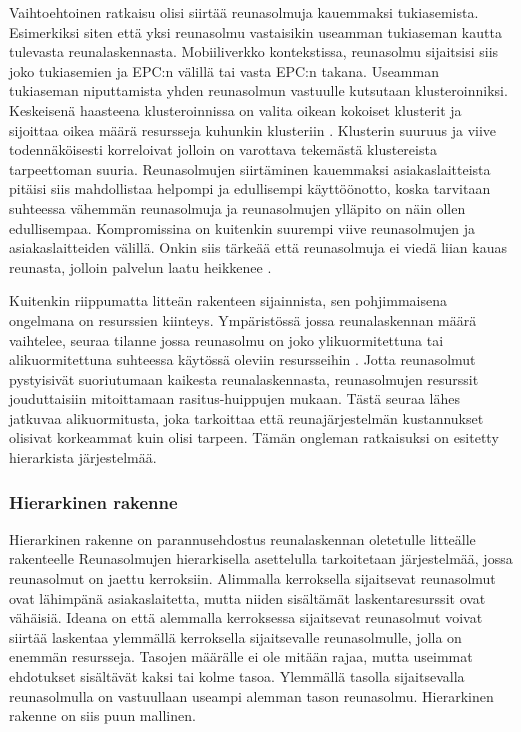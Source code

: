Vaihtoehtoinen ratkaisu olisi siirtää reunasolmuja kauemmaksi tukiasemista. Esimerkiksi siten että yksi reunasolmu vastaisikin useamman tukiaseman kautta tulevasta reunalaskennasta. Mobiiliverkko kontekstissa, reunasolmu sijaitsisi siis joko tukiasemien ja EPC:n välillä tai vasta EPC:n takana.  
Useamman tukiaseman niputtamista yhden reunasolmun vastuulle kutsutaan klusteroinniksi. 
Keskeisenä haasteena klusteroinnissa on valita oikean kokoiset klusterit ja sijoittaa oikea määrä resursseja kuhunkin klusteriin \cite{malandrino2016close}.
Klusterin suuruus ja viive todennäköisesti korreloivat jolloin on varottava tekemästä klustereista tarpeettoman suuria.
Reunasolmujen siirtäminen kauemmaksi asiakaslaitteista pitäisi siis mahdollistaa helpompi ja edullisempi käyttöönotto, koska tarvitaan suhteessa vähemmän reunasolmuja ja reunasolmujen ylläpito on näin ollen edullisempaa.
Kompromissina on kuitenkin suurempi viive reunasolmujen ja asiakaslaitteiden välillä. 
Onkin siis tärkeää että reunasolmuja ei viedä liian kauas reunasta, jolloin palvelun laatu heikkenee \cite{mao17}. 


Kuitenkin riippumatta litteän rakenteen sijainnista, sen pohjimmaisena ongelmana on resurssien kiinteys. Ympäristössä jossa reunalaskennan määrä vaihtelee, seuraa tilanne jossa reunasolmu on joko ylikuormitettuna tai alikuormitettuna suhteessa käytössä oleviin resursseihin \cite{tong2016hierarchical}. Jotta reunasolmut pystyisivät suoriutumaan kaikesta reunalaskennasta, reunasolmujen resurssit jouduttaisiin mitoittamaan rasitus-huippujen mukaan. Tästä seuraa lähes jatkuvaa alikuormitusta, joka tarkoittaa että reunajärjestelmän kustannukset olisivat korkeammat kuin olisi tarpeen. 
Tämän ongleman ratkaisuksi on esitetty hierarkista järjestelmää.




\subsubsection{Hierarkinen rakenne}
Hierarkinen rakenne on parannusehdostus reunalaskennan oletetulle litteälle rakenteelle \cite{tong2016hierarchical}
Reunasolmujen hierarkisella asettelulla tarkoitetaan järjestelmää, jossa reunasolmut on jaettu kerroksiin. Alimmalla kerroksella sijaitsevat reunasolmut ovat lähimpänä asiakaslaitetta, mutta niiden sisältämät laskentaresurssit ovat vähäisiä. 
Ideana on että alemmalla kerroksessa sijaitsevat reunasolmut voivat siirtää laskentaa ylemmällä kerroksella sijaitsevalle reunasolmulle, jolla on enemmän resursseja. Tasojen määrälle ei ole mitään rajaa, mutta useimmat ehdotukset sisältävät kaksi tai kolme tasoa.
Ylemmällä tasolla sijaitsevalla reunasolmulla on vastuullaan useampi alemman tason reunasolmu. Hierarkinen rakenne on siis puun mallinen.

